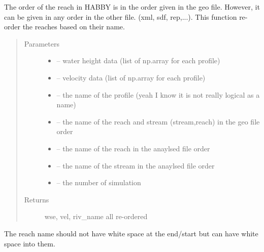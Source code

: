 \documentclass[letterpaper,10pt,english]{sphinxmanual}
\begin{document}
\begin{fulllineitems}
\label{\detokenize{index:src.Hec_ras06.reorder_reach}}
The order of the reach in HABBY is in the order given in the geo file. However, it can be given in any order
in the other file. (xml, sdf, rep,...). This function re-order the reaches based on their name.
\begin{quote}\begin{description}
\item[{Parameters}] \leavevmode\begin{itemize}
\item {} 
 -- water height data (list of np.array for each profile)

\item {} 
 -- velocity data (list of np.array for each profile)

\item {} 
 -- the name of the profile (yeah I know it is not really logical as a name)

\item {} 
 -- the name of the reach and stream (stream,reach) in the geo file order

\item {} 
 -- the name of the reach in the anaylsed file order

\item {} 
 -- the name of the stream in the anaylsed file order

\item {} 
 -- the number of simulation

\end{itemize}

\item[{Returns}] \leavevmode
wse, vel, riv\_name all re-ordered

\end{description}\end{quote}


The reach name should not have white space at the end/start but can have white space into them.

\end{fulllineitems}
\end{document}
